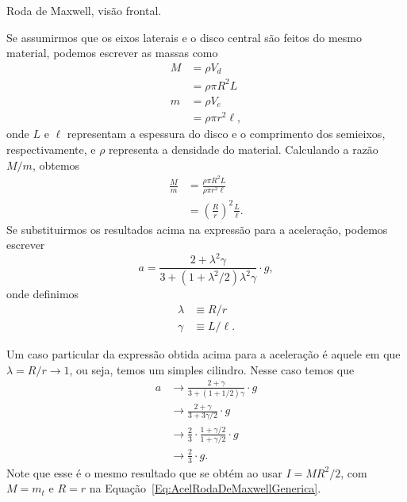 \begin{marginfigure}[1.5cm]
\centering
{}
\caption{Roda de Maxwell, visão frontal.\label{Fig:RodaDeMaxwellVisaoFrontal}}
\end{marginfigure}

Se assumirmos que os eixos laterais e o disco central são feitos do mesmo material, podemos escrever as massas como
\begin{align}
    M &= \rho V_d \\
    &= \rho \pi R^2 L \\
    m &= \rho V_e \\
    &= \rho \pi r^2 \ell,
\end{align}
%
onde $L$ e $\ell$ representam a espessura do disco e o comprimento dos semieixos, respectivamente, e $\rho$ representa a densidade do material. Calculando a razão $M/m$, obtemos
\begin{align}
    \frac{M}{m} &= \frac{\rho \pi R^2 L}{\rho \pi r^2 \ell} \\
    &= \left(\frac{R}{r}\right)^2\frac{L}{\ell}.
\end{align}
%
Se substituirmos os resultados acima na expressão para a aceleração, podemos escrever
\begin{equation}
    a = \frac{2 + \lambda^2\gamma}{3 + (1 + \lambda^2/2) \lambda^2 \gamma} \cdot g,
\end{equation}
%
onde definimos
\begin{align}
    \lambda &\equiv R/r \\
    \gamma &\equiv L/\ell.
\end{align}

Um caso particular da expressão obtida acima para a aceleração é aquele em que $\lambda = R/r \to 1$, ou seja, temos um simples cilindro. Nesse caso temos que
\begin{align}
    a &\to \frac{2 + \gamma}{3 + (1 + 1/2)\gamma} \cdot g \\
    &\to \frac{2 + \gamma}{3 + 3\gamma/2} \cdot g \\
    &\to \frac{2}{3} \cdot \frac{ 1 + \gamma/2}{1 + \gamma/2} \cdot g \\
    &\to \frac{2}{3} \cdot g.
\end{align}
%
Note que esse é o mesmo resultado que se obtém ao usar $I = MR^2 / 2$, com $M = m_t$ e $R = r$ na Equação~\eqref{Eq:AcelRodaDeMaxwellGenerica}.

